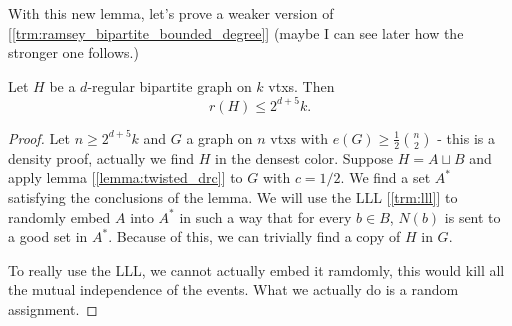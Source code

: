 With this new lemma, let's prove a weaker version of
[\ref{trm:ramsey_bipartite_bounded_degree}] (maybe I can see later
how the stronger one follows.)
\begin{theorem}
	Let $H$ be a $d$-regular bipartite graph on $k$ vtxs. Then
	\[
		r(H) \leq 2^{d+5}k.
	\]
\end{theorem}
\begin{proof}
	Let $n \geq 2^{d+5}k$ and $G$ a graph on $n$ vtxs with $e(G) \geq
	\frac{1}{2}\binom{n}{2}$ - this is a density proof, actually we find
	$H$ in the densest color.
	Suppose $H = A \sqcup B$ and apply lemma [\ref{lemma:twisted_drc}]
	to $G$ with $c = 1/2$. We find a set $A^*$ satisfying the
	conclusions of the lemma.
	We will use the LLL [\ref{trm:lll}] to randomly embed $A$ into $A^*$
	in such a way that for every $b \in B$, $N(b)$ is sent to a good set in $A^*$.
	Because of this, we can trivially find a copy of $H$ in $G$.

	To really use the LLL, we cannot actually embed it ramdomly, this
	would kill all the mutual independence of the events. What we actually do is
	a random assignment.


\end{proof}
